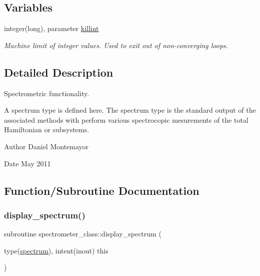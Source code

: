 \subsection*{Variables}
\begin{DoxyCompactItemize}
\item 
integer(long), parameter \hyperlink{namespacespectrometer__class_a5564f6a94902c50fefd03dd3f5ec4e47}{killint}
\begin{DoxyCompactList}\small\item\em Machine limit of integer values. Used to exit out of non-\/converging loops. \end{DoxyCompactList}\end{DoxyCompactItemize}


\subsection{Detailed Description}
Spectrometric functionality. 

A spectrum type is defined here. The spectrum type is the standard output of the associated methods with perform various spectrocopic mesurements of the total Hamiltonian or subsystems. \begin{DoxyAuthor}{Author}
Daniel Montemayor 
\end{DoxyAuthor}
\begin{DoxyDate}{Date}
May 2011 
\end{DoxyDate}


\subsection{Function/\+Subroutine Documentation}
\mbox{\label{namespacespectrometer__class_a3f9fc6096d581c5a7094174b47898d10}} 
\subsubsection{\texorpdfstring{display\+\_\+spectrum()}{display\_spectrum()}}
{\footnotesize\ttfamily subroutine spectrometer\+\_\+class\+::display\+\_\+spectrum (\begin{DoxyParamCaption}\item[{type(\hyperlink{structspectrometer__class_1_1spectrum}{spectrum}), intent(inout)}]{this }\end{DoxyParamCaption})\hspace{0.3cm}{\ttfamily [private]}}

